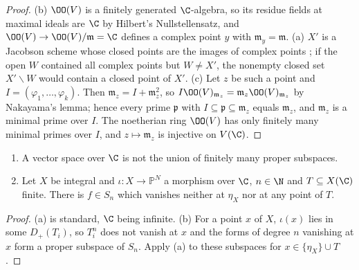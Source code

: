 \begin{proof}
(b) $\OO(V)$ is a finitely generated $\C$-algebra, so its residue fields at maximal ideals are $\C$ by Hilbert's Nullstellensatz, and
$\OO(V)\to\OO(V)/\mathfrak m=\C$ defines a complex point $y$ with $\mathfrak m_y=\mathfrak m$. (a) $X'$ is a Jacobson scheme whose closed points
are the images of complex points \cite[IV, \S10]{Grothendieck1967}; if the open $W$ contained all complex points but $W\ne X'$, the nonempty
closed set $X'\smallsetminus W$ would contain a closed point of $X'$. (c) Let $z$ be such a point and $I=(\varphi_1,\dots,\varphi_k)$. Then
$\mathfrak m_z=I+\mathfrak m_z^2$, so $I\OO(V)_{\mathfrak m_z}=\mathfrak m_z\OO(V)_{\mathfrak m_z}$ by Nakayama's lemma; hence every prime
$\mathfrak p$ with $I\subseteq\mathfrak p\subseteq\mathfrak m_z$ equals $\mathfrak m_z$, and $\mathfrak m_z$ is a minimal prime over $I$. The
noetherian ring $\OO(V)$ has only finitely many minimal primes over $I$, and $z\mapsto\mathfrak m_z$ is injective on $V(\C)$.
\end{proof}

\begin{lemma}\label{pf:hlf-cech:avoid}
\begin{enumerate}[label=(\alph*),nosep]
\item A vector space over $\C$ is not the union of finitely many proper subspaces.
\item Let $X$ be integral and $\iota\colon X\to\mathbb P^N$ a morphism over $\C$, $n\in\N$ and $T\subseteq X(\C)$ finite. There is $f\in S_n$ which
  vanishes neither at $\eta_X$ nor at any point of $T$.
\end{enumerate}
\end{lemma}

\begin{proof}
(a) is standard, $\C$ being infinite. (b) For a point $x$ of $X$, $\iota(x)$ lies in some $D_+(T_i)$, so $T_i^n$ does not vanish at $x$ and the
forms of degree $n$ vanishing at $x$ form a proper subspace of $S_n$. Apply (a) to these subspaces for $x\in\{\eta_X\}\cup T$.
\end{proof}


